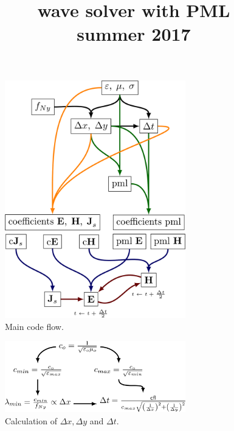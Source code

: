 \documentclass[a4paper,12pt]{article}
\title{wave solver with PML \\ \small{summer 2017}}
\author{}
\date{}
\begin{document}
\maketitle
\begin{figure}
\centering
\includegraphics[width=0.7\textwidth]{../pics/tikz/wave-flow.pdf}
\caption{Main code flow.}
\end{figure}
%
\begin{figure}
\centering
\includegraphics[width=0.7\textwidth]{../pics/tikz/dx-dy-dt.pdf}
\caption{Calculation of $\Delta x, \Delta y$ and $\Delta t$.}
\end{figure}
\end{document}
